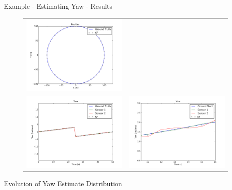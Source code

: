 \documentclass[hyperref={pdfpagelabels=false}]{beamer}
\begin{document}
\begin{frame}{Example - Estimating Yaw - Results}
\begin{figure}[ht!]
    \centering
    \begin{tabular}{c c}
    \includegraphics[width=.45\textwidth]{images/kfSimPosition} \\
    \includegraphics[width=.45\textwidth]{images/kfSimYaw} &
    \includegraphics[width=.45\textwidth]{images/kfSimYawZoom}
    \end{tabular}
\end{figure}
\end{frame}

\begin{frame}{Evolution of Yaw Estimate Distribution}
\begin{center}
\begin{figure}[ht!]
\end{figure}
\end{center}
\end{frame}
\end{document}
